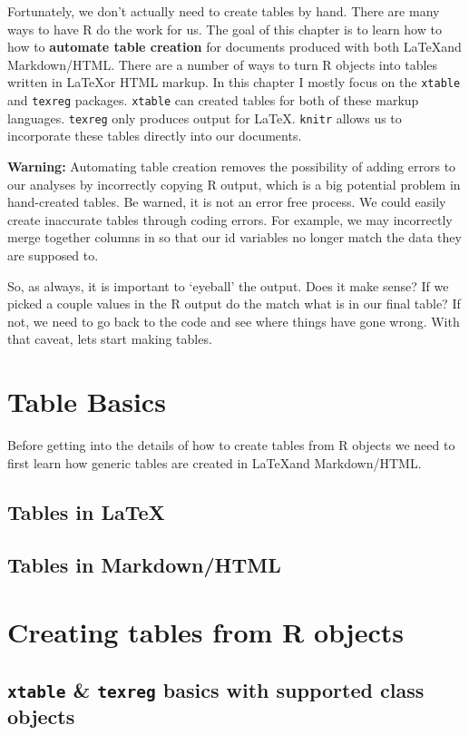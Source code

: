 \documentclass[ChapterTOCs,krantz1]{krantz}\usepackage{graphicx, color}
\begin{document}
Fortunately, we don't actually need to create tables by hand. There are
many ways to have R do the work for us. The goal of this
chapter is to learn how to how to \textbf{automate table creation} for
documents produced with both \LaTeX and Markdown/HTML. There are a
number of ways to turn R objects into tables written in
\LaTeX or HTML markup. In this chapter I mostly focus on the
\texttt{xtable} and \texttt{texreg} packages. \texttt{xtable} can
created tables for both of these markup languages. \texttt{texreg} only
produces output for \LaTeX. \texttt{knitr} allows us to incorporate
these tables directly into our documents.

\textbf{Warning:} Automating table creation removes the possibility of
adding errors to our analyses by incorrectly copying R output,
which is a big potential problem in hand-created tables. Be warned, it
is not an error free process. We could easily create inaccurate tables
through coding errors. For example, we may incorrectly merge together
columns in so that our id variables no longer match the data they are
supposed to.

So, as always, it is important to `eyeball' the output. Does it make
sense? If we picked a couple values in the R output do the
match what is in our final table? If not, we need to go back to the code
and see where things have gone wrong. With that caveat, lets start
making tables.

\section{Table Basics}

Before getting into the details of how to create tables from R objects we need to first learn how generic tables are created in \LaTeX and Markdown/HTML.

\subsection{Tables in \LaTeX}

\subsection{Tables in Markdown/HTML}

\section{Creating tables from R objects}

\subsection{\texttt{xtable} \& \texttt{texreg} basics with supported
class objects}
\end{document}
